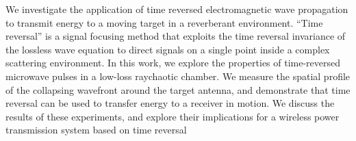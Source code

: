 % 
% 
%
We investigate the application of time reversed
electromagnetic wave propagation to transmit energy to a moving
target in a reverberant environment. “Time reversal” is a signal
focusing method that exploits the time reversal invariance of the
lossless wave equation to direct signals on a single point inside
a complex scattering environment. In this work, we explore the
properties of time-reversed microwave pulses in a low-loss raychaotic
chamber. We measure the spatial profile of the collapsing
wavefront around the target antenna, and demonstrate that time
reversal can be used to transfer energy to a receiver in motion.
We discuss the results of these experiments, and explore their
implications for a wireless power transmission system based on
time reversal
